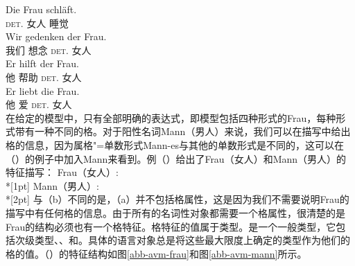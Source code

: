 \eal\settowidth{}
\ex 
\gll Die        Frau schläft. \\      
     \textsc{det}.\nom{} 女人 睡觉\\
\ex 
\gll Wir gedenken der Frau. \\ 
     我们 想念 \textsc{det}.\gen{} 女人\\
\ex 
\gll Er hilft der Frau.  \\    
     他 帮助 \textsc{det}.\dat{} 女人\\
\ex 
\gll Er liebt die Frau.   \\   
     他 爱 \textsc{det}.\acc{} 女人\\
\zl
在给定的模型中，只有全部明确的表达式，即模型包括四种形式的Frau，每种形式带有一种不同的格。对于阳性名词Mann（男人）来说，我们可以在描写中给出格的信息，因为属格"=单数形式Mann-es与其他的单数形式是不同的，这可以在（）的例子中加入Mann来看到。例（）给出了Frau（女人）和Mann（男人）的特征描写：
\eal
\ex\label{avm-frau}
Frau（女人）:\\*[1pt]
\ex\label{avm-mann}
Mann（男人）:\\*[2pt]
\zl
与（b）不同的是，（a）并不包括格属性，这是因为我们不需要说明Frau的描写中有任何格的信息。由于所有的名词性对象都需要一个格属性，很清楚的是Frau的结构必须也有一个格特征。格特征的值属于类型。是一个一般类型，它包括次级类型、、和。具体的语言对象总是将这些最大限度上确定的类型作为他们的格的值。（）的特征结构如图\ref{abb-avm-frau}和图\ref{abb-avm-mann}所示。
